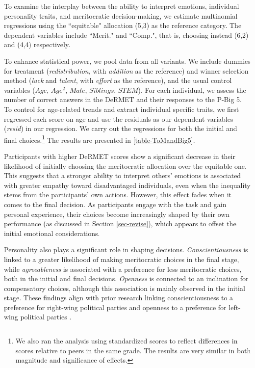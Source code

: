 \documentclass[11pt]{article}
\begin{document}
To examine the interplay between the ability to interpret emotions, individual personality traits, and meritocratic decision-making, we estimate multinomial regressions using the ``equitable" allocation (5,3) as the reference category. The dependent variables include ``Merit." and ``Comp.", that is, choosing instead (6,2) and (4,4) respectively.

To enhance statistical power, we pool data from all variants. We include dummies for treatment (\emph{redistribution}, with \emph{addition} as the reference) and winner selection method (\emph{luck} and \emph{talent}, with  \emph{effort} as the reference), and the usual control variables ($Age$, $Age^2$, $Male$, $Siblings$, $STEM$). For each individual, we assess the number of correct answers in the DeRMET and their responses to the P-Big 5. To control for age-related trends and extract individual specific traits, we first regressed each score on age and use the residuals as our dependent variables (\emph{resid}) in our regression. We carry out the regressions for both the initial and final choices.\footnote{We also ran the analysis using standardized scores to reflect differences in scores relative to peers in the same grade. The results are very similar in both magnitude and significance of effects.} The results are presented in \autoref{table-ToMandBig5}.



Participants with higher DeRMET scores show a significant decrease in their likelihood of initially choosing the meritocratic allocation over the equitable one. This suggests that a stronger ability to interpret others’ emotions is associated with greater empathy toward disadvantaged individuals, even when the inequality stems from the participants' own actions. However, this effect fades when it comes to the final decision. As participants engage with the task and gain personal experience, their choices become increasingly shaped by their own performance (as discussed in Section \ref{sec-revise}), which appears to offset the initial emotional considerations.

Personality also plays a significant role in shaping decisions. \emph{Conscientiousness} is linked to a greater likelihood of making meritocratic choices in the final stage, while \emph{agreeableness} is associated with a preference for less meritocratic choices, both in the initial and final decisions. \emph{Openness} is connected to an inclination for compensatory choices, although this association is mainly observed in the initial stage. These findings align with prior research linking conscientiousness to a preference for right-wing political parties and openness to a preference for left-wing political parties \citep{vecchione2011personality, furnham2018personality, ekstrom2019personality}.
\end{document}
